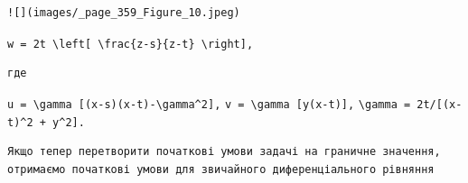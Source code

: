 \documentclass[
  ukrainian,
]{article}
\begin{document}
\begin{verbatim}
![](images/_page_359_Figure_10.jpeg)
\end{verbatim}

\texttt{w\ =\ 2t\ \textbackslash{}left{[}\ \textbackslash{}frac\{z-s\}\{z-t\}\ \textbackslash{}right{]},}

\begin{verbatim}
где
\end{verbatim}

\texttt{u\ =\ \textbackslash{}gamma\ {[}(x-s)(x-t)-\textbackslash{}gamma\^{}2{]},}
\texttt{v\ =\ \textbackslash{}gamma\ {[}y(x-t){]},}
\texttt{\textbackslash{}gamma\ =\ 2t/{[}(x-t)\^{}2\ +\ y\^{}2{]}.}

\begin{verbatim}
Якщо тепер перетворити початкові умови задачі на граничне значення, отримаємо початкові умови для звичайного диференціального рівняння


\end{verbatim}
\end{document}
